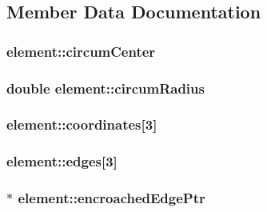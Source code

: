 \subsection{Member Data Documentation}
\hypertarget{structelement_a4212bfb7df529f767e2b9acbced3c71c}{
\subsubsection[{circum\-Center}]{ element\-::circum\-Center}}\label{structelement_a4212bfb7df529f767e2b9acbced3c71c}
\hypertarget{structelement_a697553df37ab4269126d4ee1f3f3a2b2}{
\subsubsection[{circum\-Radius}]{\setlength{\rightskip}{0pt plus 5cm}double element\-::circum\-Radius}}\label{structelement_a697553df37ab4269126d4ee1f3f3a2b2}
\hypertarget{structelement_a4ad4052bfef08c7371b665e6cc99b6f6}{
\subsubsection[{coordinates}]{ element\-::coordinates\mbox{[}3\mbox{]}}}\label{structelement_a4ad4052bfef08c7371b665e6cc99b6f6}
\hypertarget{structelement_a07ee3a59552f0477a1a887b8853257bd}{
\subsubsection[{edges}]{ element\-::edges\mbox{[}3\mbox{]}}}\label{structelement_a07ee3a59552f0477a1a887b8853257bd}
\hypertarget{structelement_a13e83b80790f5b770e39520e403dab17}{
\subsubsection[{encroached\-Edge\-Ptr}]{$\ast$ element\-::encroached\-Edge\-Ptr}}\label{structelement_a13e83b80790f5b770e39520e403dab17}
